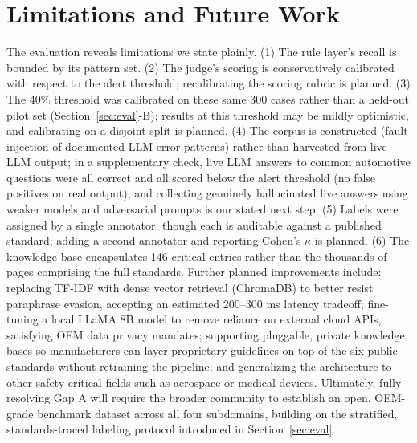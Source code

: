 \documentclass[conference,a4paper]{IEEEtran}
\begin{document}
\section{Limitations and Future Work}
\label{sec:limitations}
The evaluation reveals limitations we state plainly. (1) The rule layer's recall is bounded by its pattern set. (2) The judge's scoring is conservatively calibrated with respect to the alert threshold; recalibrating the scoring rubric is planned. (3) The 40\% threshold was calibrated on these same 300 cases rather than a held-out pilot set (Section~\ref{sec:eval}-B); results at this threshold may be mildly optimistic, and calibrating on a disjoint split is planned. (4) The corpus is constructed (fault injection of documented LLM error patterns) rather than harvested from live LLM output; in a supplementary check, live LLM answers to common automotive questions were all correct and all scored below the alert threshold (no false positives on real output), and collecting genuinely hallucinated live answers using weaker models and adversarial prompts is our stated next step. (5) Labels were assigned by a single annotator, though each is auditable against a published standard; adding a second annotator and reporting Cohen's $\kappa$ is planned. (6) The knowledge base encapsulates 146 critical entries rather than the thousands of pages comprising the full standards. Further planned improvements include: replacing TF-IDF with dense vector retrieval (ChromaDB) to better resist paraphrase evasion, accepting an estimated 200--300 ms latency tradeoff; fine-tuning a local LLaMA 8B model to remove reliance on external cloud APIs, satisfying OEM data privacy mandates; supporting pluggable, private knowledge bases so manufacturers can layer proprietary guidelines on top of the six public standards without retraining the pipeline; and generalizing the architecture to other safety-critical fields such as aerospace or medical devices. Ultimately, fully resolving Gap A will require the broader community to establish an open, OEM-grade benchmark dataset across all four subdomains, building on the stratified, standards-traced labeling protocol introduced in Section~\ref{sec:eval}.
\end{document}
